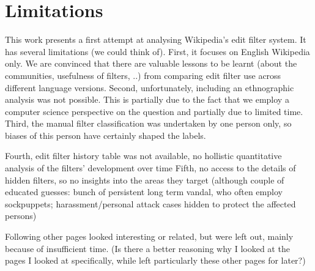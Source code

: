 \begin{comment}
Claudia: * A focus on the Good faith policies/guidelines is a historical development. After the huge surge in edits Wikipedia experienced starting 2005 the community needed a means to handle these (and the proportional amount of vandalism). They opted for automatisation. Automated system branded a lot of good faith edits as vandalism, which drove new comers away. A policy focus on good faith is part of the intentions to fix this.

 could be that the high hit count was made by false positives, which will have led to disabling the filter (TODO: that's a very interesting question actually; how do we know the high number of hits were actually leggit problems the filter wanted to catch and no false positives?)
--  we can't really? unless we study the edits themselves; I did this exemplarily for edits from the peak period in 2016; they were not false positives but a big spam wave.
\end{comment}


\section{Limitations}

This work presents a first attempt at analysing Wikipedia's edit filter system.
It has several limitations (we could think of).
First, it focuses on English Wikipedia only.
We are convinced that there are valuable lessons to be learnt (about the communities, usefulness of filters, ..) from comparing edit filter use across different language versions.
Second, unfortunately, including an ethnographic analysis was not possible.
This is partially due to the fact that we employ a computer science perspective on the question and partially due to limited time.
Third, the manual filter classification was undertaken by one person only, so biases of this person have certainly shaped the labels.

Fourth, edit filter history table was not available, no hollistic quantitative analysis of the filters' development over time
Fifth, no access to the details of hidden filters, so no insights into the areas they target (although couple of educated guesses: bunch of persistent long term vandal, who often employ sockpuppets; harassment/personal attack cases hidden to protect the affected persons)


Following other pages looked interesting or related, but were left out, mainly because of insufficient time.
(Is there a better reasoning why I looked at the pages I looked at specifically, while left particularly these other pages for later?)

